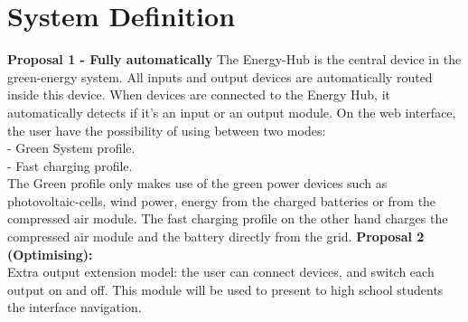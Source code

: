 \section{System Definition}
\textbf{Proposal 1 - Fully automatically}\p
The Energy-Hub is the central device in the green-energy system. All
inputs and output devices are automatically routed inside this
device. When devices are connected to the Energy Hub, it automatically
detects if it's an input or an output module.\p
 On the web interface, the user have the possibility of using between two modes:
\\ - Green System profile.
\\ - Fast charging profile.
\\The Green profile only makes use of the green power devices such as
photovoltaic-cells, wind power, energy from the charged batteries or from the
compressed air module.
The fast charging profile on the other hand charges the compressed air module and the
battery directly from the grid.
\p
\textbf{Proposal 2 (Optimising):}\\
Extra output extension model: the user can connect devices, and switch
each output on and off. This module will be used to present to high school
students the interface navigation.





